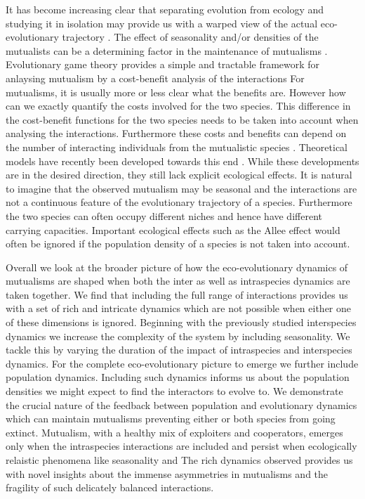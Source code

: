 \documentclass[12pt]{article}
\begin{document}
It has become increasing clear that separating evolution from ecology and studying it in isolation may provide us with a warped view of the actual eco-evolutionary trajectory \citep{sanchez:PLoSB:2013}.
The effect of seasonality and/or densities of the mutualists can be a determining factor in the maintenance of mutualisms \citep{visick:JB:2000,warren:GCB:2014,mcfallngai:PLoSB:2014}.
Evolutionary game theory provides a simple and tractable framework for anlaysing mutualism by a cost-benefit analysis of the interactions \citep{trivers:QRB:1971,weibull:book:1995,hofbauer:JMB:1996,hofbauer:book:1998}
For mutualisms, it is usually more or less clear what the benefits are.
However how can we exactly quantify the costs involved for the two species.
This difference in the cost-benefit functions for the two species needs to be taken into account when analysing the interactions.
Furthermore these costs and benefits can depend on the number of interacting individuals from the mutualistic species \citep{pierce:BES:1987,noe:TREE:1995,hoelldobler:book:1990,hill:OEC:1989,noe:book:2001,kiers:Nature:2003,stanton:AmNat:2003,stadler:book:2008,kiers:Science:2011}. 
Theoretical models have recently been developed towards this end \citep{archetti:EL:2011,archetti:JTB:2013}. 
While these developments are in the desired direction, they still lack explicit ecological effects.
It is natural to imagine that the observed mutualism may be seasonal and the interactions are not a continuous feature of the evolutionary trajectory of a species. 
Furthermore the two species can often occupy different niches and hence have different carrying capacities.
Important ecological effects such as the Allee effect would often be ignored if the population density of a species is not taken into account.


Overall we look at the broader picture of how the eco-evolutionary dynamics of mutualisms are shaped when both the inter as well as intraspecies dynamics are taken together. 
We find that including the full range of interactions provides us with a set of rich and intricate dynamics which are not possible when either one of these dimensions is ignored.
Beginning with the previously studied interspecies dynamics \citep{gokhale:PRSB:2012} we increase the complexity of the system by including seasonality.
We tackle this by varying the duration of the impact of intraspecies and interspecies dynamics.
For the complete eco-evolutionary picture to emerge we further include population dynamics.
Including such dynamics informs us about the population densities we might expect to find the interactors to evolve to.
We demonstrate the crucial nature of the feedback between population and evolutionary dynamics which can maintain mutualisms preventing either or both species from going extinct.
Mutualism, with a healthy mix of exploiters and cooperators, emerges only when the intraspecies interactions are included and persist when ecologically relaistic phenomena like seasonality and 
The rich dynamics observed provides us with novel insights about the immense asymmetries in mutualisms and the fragility of such delicately balanced interactions.
\end{document}
